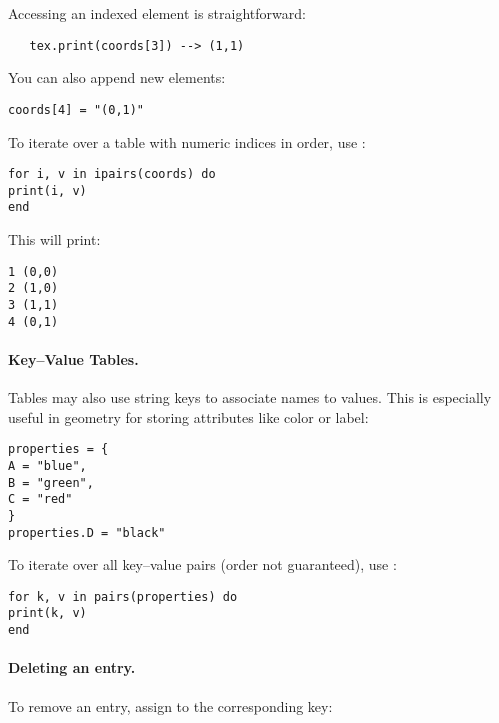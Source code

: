 Accessing an indexed element is straightforward:

\begin{verbatim}
   tex.print(coords[3]) --> (1,1)
\end{verbatim}

You can also append new elements:

\begin{verbatim}
coords[4] = "(0,1)"
\end{verbatim}

To iterate over a table with numeric indices in order, use :

\begin{mybox}
\begin{verbatim}
for i, v in ipairs(coords) do
print(i, v)
end
\end{verbatim}
\end{mybox}

This will print:

\begin{verbatim}
1 (0,0)
2 (1,0)
3 (1,1)
4 (0,1)
\end{verbatim}


\paragraph{Key–Value Tables.}
Tables may also use string keys to associate names to values. This is especially useful in geometry for storing attributes like color or label:

\begin{mybox}
\begin{verbatim}
properties = {
A = "blue",
B = "green",
C = "red"
}
properties.D = "black"
\end{verbatim}
\end{mybox}

To iterate over all key–value pairs (order not guaranteed), use :

\begin{mybox}
\begin{verbatim}
for k, v in pairs(properties) do
print(k, v)
end
\end{verbatim}
\end{mybox}

\paragraph{Deleting an entry.}
To remove an entry, assign  to the corresponding key:


